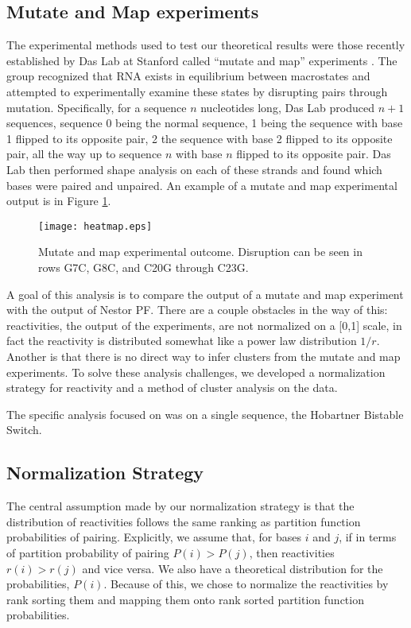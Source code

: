 \subsection{Mutate and Map experiments}

The experimental methods used to test our theoretical results were
those recently established by Das Lab at Stanford called ``mutate and
map'' experiments \cite{kladwang2011two}. The group recognized that
RNA exists in equilibrium between macrostates and attempted to
experimentally examine these states by disrupting pairs through
mutation. Specifically, for a sequence $n$ nucleotides long, Das Lab
produced $n+1$ sequences, sequence 0 being the normal sequence, 1
being the sequence with base 1 flipped to its opposite pair, 2 the
sequence with base 2 flipped to its opposite pair, all the way up to
sequence $n$ with base $n$ flipped to its opposite pair. Das Lab then
performed shape analysis on each of these strands and found which
bases were paired and unpaired. An example of a mutate and map
experimental output is in Figure \ref{fig:heatmap}.
\begin{figure}[t]
\texttt{[image: heatmap.eps]}
\caption{Mutate and map experimental outcome. Disruption can be seen
  in rows G7C, G8C, and C20G through C23G.}
\label{fig:heatmap}
\end{figure}

A goal of this analysis is to compare the output of a mutate and map
experiment with the output of Nestor PF. There are a couple obstacles
in the way of this: reactivities, the output of the experiments, are
not normalized on a [0,1] scale, in fact the reactivity is distributed
somewhat like a power law distribution $1/r$. Another is that there is
no direct way to infer clusters from the mutate and map
experiments. To solve these analysis challenges, we developed a
normalization strategy for reactivity and a method of cluster analysis
on the data.

The specific analysis focused on was on a single sequence, the
Hobartner Bistable Switch. 

\subsection{Normalization Strategy}

The central assumption made by our normalization strategy is that the
distribution of reactivities follows the same ranking as partition
function probabilities of pairing. Explicitly, we assume that, for
bases $i$ and $j$, if in terms of partition probability of pairing
$P(i)>P(j)$, then reactivities $r(i) > r(j)$ and vice versa. We also
have a theoretical distribution for the probabilities, $P(i)$. Because
of this, we chose to normalize the reactivities by rank sorting them
and mapping them onto rank sorted partition function probabilities.

